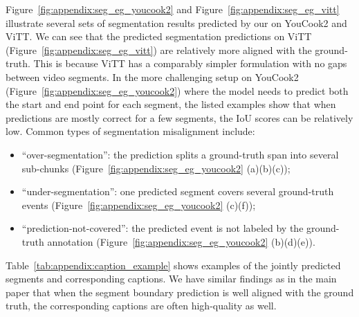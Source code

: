\documentclass[11pt]{article}
\begin{document}
Figure~\ref{fig:appendix:seg_eg_youcook2} and Figure~\ref{fig:appendix:seg_eg_vitt} illustrate several sets of segmentation results predicted by our \segcap on YouCook2 and ViTT. 
We can see that the predicted segmentation predictions on ViTT (Figure~\ref{fig:appendix:seg_eg_vitt}) are relatively more aligned with the ground-truth. This is because ViTT has a comparably simpler formulation with no gaps between video segments. 
In the more challenging setup on YouCook2 (Figure~\ref{fig:appendix:seg_eg_youcook2}) where the model needs to predict both the start and end point for each segment, the listed examples show that when predictions are mostly correct for a few segments, the IoU scores can be relatively low. 
Common types of segmentation misalignment include: 
\begin{itemize}[noitemsep,topsep=0pt,parsep=0pt,partopsep=0pt]
    \item ``over-segmentation'': the prediction splits a ground-truth span into several sub-chunks (Figure~\ref{fig:appendix:seg_eg_youcook2} (a)(b)(c)); 
    \item ``under-segmentation'': one predicted segment covers several ground-truth events (Figure~\ref{fig:appendix:seg_eg_youcook2} (c)(f)); 
    \item ``prediction-not-covered'': the predicted event is not labeled by the ground-truth annotation (Figure~\ref{fig:appendix:seg_eg_youcook2} (b)(d)(e)).
\end{itemize}

Table~\ref{tab:appendix:caption_example} shows examples of the jointly predicted segments and corresponding captions. We have similar findings as in the main paper that when the segment boundary prediction is well aligned with the ground truth, the corresponding captions are often high-quality as well.
\end{document}

